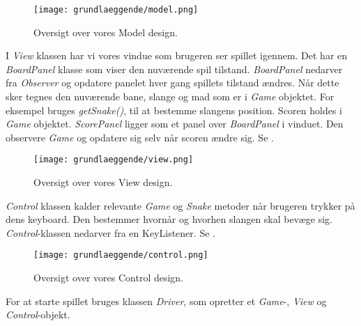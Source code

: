 \begin{figure}
	\centering
   	\texttt{[image: grundlaeggende/model.png]}
	\hspace{0.1\textwidth}
	\caption{Oversigt over vores Model design.}
\end{figure}

I \textit{View} klassen har vi vores vindue som brugeren ser spillet igennem. Det har en \textit{BoardPanel} klasse som viser den nuværende spil tilstand. \textit{BoardPanel} nedarver fra \textit{Observer} og opdatere panelet hver gang spillets tilstand ændres. Når dette sker tegnes den nuværende bane, slange og mad som er i \textit{Game} objektet. For eksempel bruges \textit{getSnake()}, til at bestemme slangens position. Scoren holdes i \textit{Game} objektet. \textit{ScorePanel} ligger som et panel over \textit{BoardPanel} i vinduet. Den observere \textit{Game} og opdatere sig selv når scoren ændre sig. Se .

\begin{figure}
	\centering
   	\texttt{[image: grundlaeggende/view.png]}
	\hspace{0.1\textwidth}
	\caption{Oversigt over vores View design.}
\end{figure}

\textit{Control} klassen kalder relevante \textit{Game} og \textit{Snake} metoder når brugeren trykker på dens keyboard. Den bestemmer hvornår og hvorhen slangen skal bevæge sig. \textit{Control}-klassen nedarver fra en KeyListener. Se .

\begin{figure}
	\centering
   	\texttt{[image: grundlaeggende/control.png]}
	\hspace{0.1\textwidth}
	\caption{Oversigt over vores Control design.}
\end{figure}

For at starte spillet bruges klassen \textit{Driver}, som opretter et \textit{Game}-, \textit{View} og \textit{Control}-objekt.